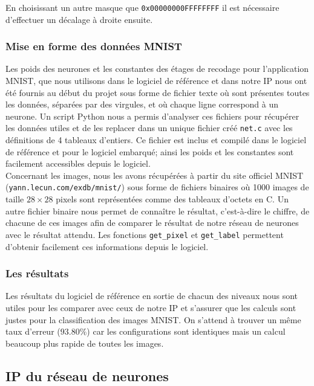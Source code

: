 En choisissant un autre masque que
\texttt{0x00000000FFFFFFFF}
il est nécessaire d'effectuer un décalage à droite ensuite.

\subsubsection{Mise en forme des données MNIST}

Les poids des neurones et les constantes des étages de recodage
pour l'application MNIST\cite{lecun2010mnist}, que nous utilisons dans
le logiciel de référence et dans notre IP nous ont été fournis au début du projet
sous forme de fichier texte où sont présentes toutes les données, séparées par
des virgules, et où chaque ligne correspond à un neurone. Un script Python nous
a permis d'analyser ces fichiers pour récupérer les données utiles et de les
replacer dans un unique fichier créé \texttt{net.c} avec les définitions de
4 tableaux d'entiers. Ce fichier est inclus et compilé dans le logiciel de référence et
pour le logiciel embarqué; ainsi les poids et les constantes sont
facilement accessibles depuis le logiciel. \\
Concernant les images, nous les avons récupérées à partir du site
officiel MNIST \linebreak (\texttt{yann.lecun.com/exdb/mnist/}) sous forme de fichiers
binaires où 1000 images de taille $28 \times 28$ pixels sont représentées comme
des tableaux d'octets en C. Un autre fichier binaire nous permet de connaître
le résultat, c'est-à-dire le chiffre, de chacune de ces images afin de comparer le
résultat de notre réseau de neurones avec le résultat attendu.
Les fonctions \texttt{get\_pixel} et \texttt{get\_label} permettent d'obtenir
facilement ces informations depuis le logiciel.

\subsubsection{Les résultats}

Les résultats du logiciel de référence en sortie de chacun des niveaux nous
sont utiles pour les comparer avec ceux de notre IP et s'assurer que les calculs
sont justes pour la classification des images MNIST\cite{lecun2010mnist}. On s'attend à trouver
un même taux d'erreur ($93.80\%$) car les configurations sont identiques
mais un calcul beaucoup plus rapide de toutes les images.



\subsection{IP du réseau de neurones}

